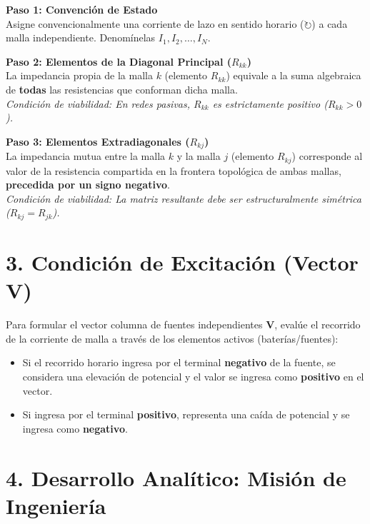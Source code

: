\documentclass[11pt,a4paper]{article}
\begin{document}
\begin{tcolorbox}[colback=blue!5!white,colframe=UCBblue,title=\textbf{Procedimiento de Ensamblaje Matricial}]
\textbf{Paso 1: Convención de Estado} \\
Asigne convencionalmente una corriente de lazo en sentido horario ($\circlearrowright$) a cada malla independiente. Denomínelas $I_1, I_2, \dots, I_N$.

\vspace{0.2cm}
\textbf{Paso 2: Elementos de la Diagonal Principal ($R_{kk}$)} \\
La impedancia propia de la malla $k$ (elemento $R_{kk}$) equivale a la suma algebraica de \textbf{todas} las resistencias que conforman dicha malla. \\
\textit{Condición de viabilidad: En redes pasivas, $R_{kk}$ es estrictamente positivo ($R_{kk} > 0$).}

\vspace{0.2cm}
\textbf{Paso 3: Elementos Extradiagonales ($R_{kj}$)} \\
La impedancia mutua entre la malla $k$ y la malla $j$ (elemento $R_{kj}$) corresponde al valor de la resistencia compartida en la frontera topológica de ambas mallas, \textbf{precedida por un signo negativo}. \\
\textit{Condición de viabilidad: La matriz resultante debe ser estructuralmente simétrica ($R_{kj} = R_{jk}$).}
\end{tcolorbox}

\section*{3. Condición de Excitación (Vector $\mathbf{V}$)}
Para formular el vector columna de fuentes independientes $\mathbf{V}$, evalúe el recorrido de la corriente de malla a través de los elementos activos (baterías/fuentes):
\begin{itemize}
    \item Si el recorrido horario ingresa por el terminal \textbf{negativo} de la fuente, se considera una elevación de potencial y el valor se ingresa como \textbf{positivo} en el vector.
    \item Si ingresa por el terminal \textbf{positivo}, representa una caída de potencial y se ingresa como \textbf{negativo}.
\end{itemize}

\newpage

\section*{4. Desarrollo Analítico: Misión de Ingeniería}
\end{document}
